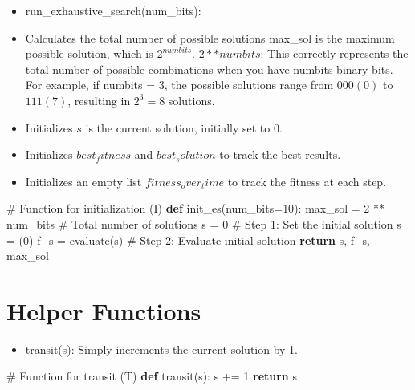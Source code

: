 \documentclass[
  letterpaper,
  DIV=11,
  numbers=noendperiod]{scrreprt}
\newenvironment{Shaded}{\begin{snugshade}}{\end{snugshade}}
\newcommand{\CommentTok}[1]{\textcolor[rgb]{0.37,0.37,0.37}{#1}}
\newcommand{\ControlFlowTok}[1]{\textcolor[rgb]{0.00,0.23,0.31}{\textbf{#1}}}
\newcommand{\DecValTok}[1]{\textcolor[rgb]{0.68,0.00,0.00}{#1}}
\newcommand{\KeywordTok}[1]{\textcolor[rgb]{0.00,0.23,0.31}{\textbf{#1}}}
\newcommand{\NormalTok}[1]{\textcolor[rgb]{0.00,0.23,0.31}{#1}}
\newcommand{\OperatorTok}[1]{\textcolor[rgb]{0.37,0.37,0.37}{#1}}
\providecommand{\tightlist}{%
  \setlength{\itemsep}{0pt}\setlength{\parskip}{0pt}}\usepackage{longtable,booktabs,array}
\begin{document}
\begin{itemize}
\tightlist
\item
  run\_exhaustive\_search(num\_bits):
\item
  Calculates the total number of possible solutions max\_sol is the
  maximum possible solution, which is \(2^{numbits}\). \(2 ** numbits\):
  This correctly represents the total number of possible combinations
  when you have numbits binary bits. For example, if numbits = 3, the
  possible solutions range from \(000 (0)\) to \(111 (7)\), resulting in
  \(2^3=8\) solutions.
\item
  Initializes \(s\) is the current solution, initially set to 0.
\item
  Initializes \(best_fitness\) and \(best_solution\) to track the best
  results.
\item
  Initializes an empty list \(fitness_over_time\) to track the fitness
  at each step.
\end{itemize}

\begin{Shaded}
\begin{Highlighting}[]
\CommentTok{\# Function for initialization (I)}
\KeywordTok{def}\NormalTok{ init\_es(num\_bits}\OperatorTok{=}\DecValTok{10}\NormalTok{):}
\NormalTok{    max\_sol }\OperatorTok{=} \DecValTok{2} \OperatorTok{**}\NormalTok{ num\_bits  }\CommentTok{\# Total number of solutions}
\NormalTok{    s }\OperatorTok{=} \DecValTok{0}  \CommentTok{\# Step 1: Set the initial solution s = (0)}
\NormalTok{    f\_s }\OperatorTok{=}\NormalTok{ evaluate(s)  }\CommentTok{\# Step 2: Evaluate initial solution}
    \ControlFlowTok{return}\NormalTok{ s, f\_s, max\_sol}
\end{Highlighting}
\end{Shaded}

\section{Helper Functions}\label{helper-functions}

\begin{itemize}
\tightlist
\item
  transit(s): Simply increments the current solution by 1.
\end{itemize}

\begin{Shaded}
\begin{Highlighting}[]
\CommentTok{\# Function for transit (T)}
\KeywordTok{def}\NormalTok{ transit(s):}
\NormalTok{    s }\OperatorTok{+=} \DecValTok{1}
    \ControlFlowTok{return}\NormalTok{ s}
\end{Highlighting}
\end{Shaded}
\end{document}
